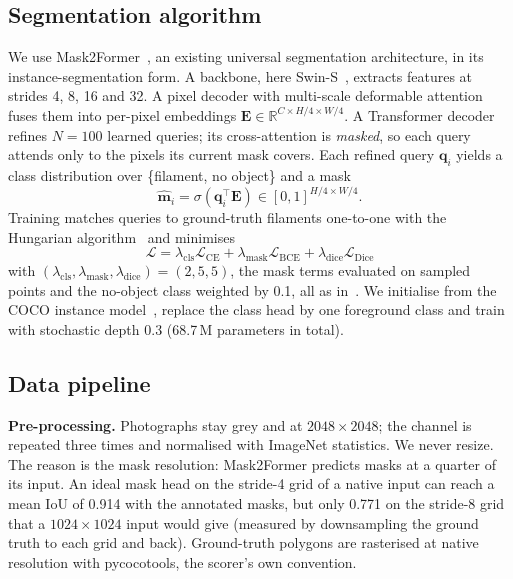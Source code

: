 \documentclass[sigconf]{acmart}
\begin{document}
\subsection{Segmentation algorithm}
We use Mask2Former~\cite{mask2former}, an existing universal segmentation architecture,
in its instance-segmentation form. A backbone, here Swin-S~\cite{swin}, extracts
features at strides 4, 8, 16 and 32. A pixel decoder with multi-scale deformable
attention~\cite{deformabledetr} fuses them into per-pixel embeddings
$\mathbf{E}\in\mathbb{R}^{C\times H/4\times W/4}$. A Transformer decoder refines
$N=100$ learned queries; its cross-attention is \emph{masked}, so each query attends only
to the pixels its current mask covers. Each refined query $\mathbf{q}_i$ yields a class
distribution over \{filament, no object\} and a mask
\begin{equation}
\hat{\mathbf{m}}_i=\sigma\!\left(\mathbf{q}_i^{\top}\mathbf{E}\right)\in[0,1]^{H/4\times W/4}.
\end{equation}
Training matches queries to ground-truth filaments one-to-one with the Hungarian
algorithm~\cite{kuhn} and minimises
\begin{equation}
\mathcal{L}=\lambda_{\mathrm{cls}}\mathcal{L}_{\mathrm{CE}}
+\lambda_{\mathrm{mask}}\mathcal{L}_{\mathrm{BCE}}
+\lambda_{\mathrm{dice}}\mathcal{L}_{\mathrm{Dice}}
\end{equation}
with $(\lambda_{\mathrm{cls}},\lambda_{\mathrm{mask}},\lambda_{\mathrm{dice}})=(2,5,5)$,
the mask terms evaluated on sampled points and the no-object class weighted by 0.1, all
as in~\cite{mask2former}. We initialise from the COCO instance
model~\cite{coco}, replace the class head by one foreground class and train with
stochastic depth 0.3 (68.7\,M parameters in total).

\subsection{Data pipeline}
\textbf{Pre-processing.} Photographs stay grey and at $2048\times2048$; the channel is
repeated three times and normalised with ImageNet statistics. We never resize. The
reason is the mask resolution: Mask2Former predicts masks at a quarter of its input.
An ideal mask head on the stride-4 grid of a native input can reach a mean IoU of 0.914
with the annotated masks, but only 0.771 on the stride-8 grid that a $1024\times1024$
input would give (measured by downsampling the ground truth to each grid and back).
Ground-truth polygons are rasterised at native resolution with pycocotools, the
scorer's own convention.
\end{document}

